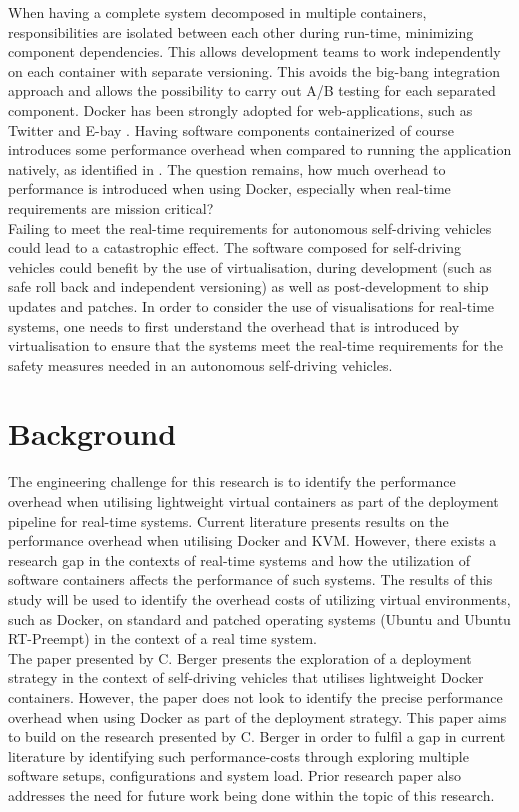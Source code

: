 When having a complete system decomposed in multiple containers, responsibilities are isolated between each other during run-time, minimizing component dependencies. This allows development teams to work independently on each container with separate versioning. This avoids the big-bang integration approach and allows the possibility to carry out A/B testing for each separated component. Docker has been strongly adopted for web-applications, such as Twitter and E-bay \cite{7034713}. Having software components containerized of course introduces some performance overhead when compared to running the application natively, as identified in \cite{7034713}. The question remains, how much overhead to performance is introduced when using Docker, especially when real-time requirements are mission critical?\\

Failing to meet the real-time requirements for autonomous self-driving vehicles could lead to a catastrophic effect. The software composed for self-driving vehicles could benefit by the use of virtualisation, during development (such as safe roll back and independent versioning) as well as post-development to ship updates and patches. In order to consider the use of visualisations for real-time systems, one needs to first understand the overhead that is introduced by virtualisation to ensure that the systems meet the real-time requirements for the safety measures needed in an autonomous self-driving vehicles.\\

\section{Background}

The engineering challenge for this research is to identify the performance overhead when utilising lightweight virtual containers as part of the deployment pipeline for real-time systems. Current literature \cite{vmvscontainers} presents results on the performance overhead when utilising Docker and KVM. However, there exists a research gap in the contexts of real-time systems and how the utilization of software containers affects the performance of such systems. The results of this study will be used to identify the overhead costs of utilizing virtual environments, such as Docker, on standard and patched operating systems (Ubuntu and Ubuntu RT-Preempt) in the context of a real time system.\\

The paper presented by C. Berger \cite{cberger} presents the exploration of a deployment strategy in the context of self-driving vehicles that utilises lightweight Docker containers. However, the paper does not look to identify the precise performance overhead when using Docker as part of the deployment strategy. This paper aims to build on the research presented by C. Berger in order to fulfil a gap in current literature by identifying such performance-costs through exploring multiple software setups, configurations and system load. Prior research paper \cite{cberger} also addresses the need for future work being done within the topic of this research.\\

